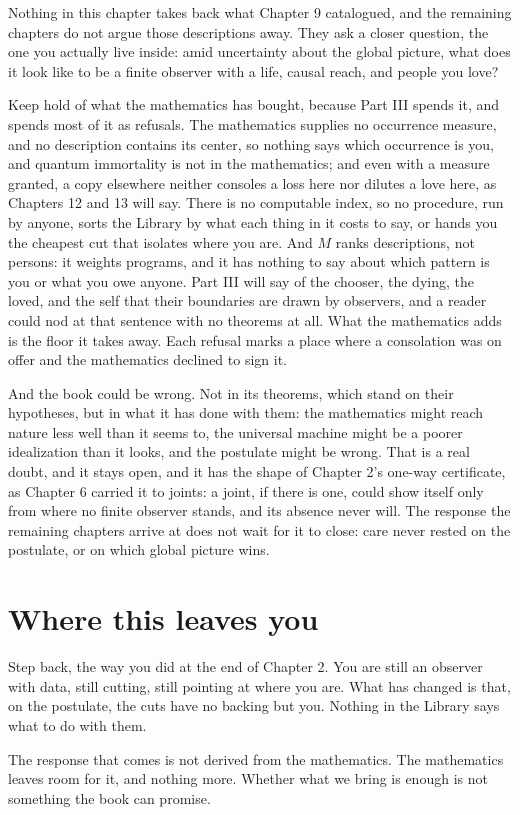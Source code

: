 Nothing in this chapter takes back what Chapter 9 catalogued, and the remaining chapters do not argue those descriptions away. They ask a closer question, the one you actually live inside: amid uncertainty about the global picture, what does it look like to be a finite observer with a life, causal reach, and people you love?

Keep hold of what the mathematics has bought, because Part III spends it, and spends most of it as refusals. The mathematics supplies no occurrence measure, and no description contains its center, so nothing says which occurrence is you, and quantum immortality is not in the mathematics; and even with a measure granted, a copy elsewhere neither consoles a loss here nor dilutes a love here, as Chapters 12 and 13 will say. There is no computable index, so no procedure, run by anyone, sorts the Library by what each thing in it costs to say, or hands you the cheapest cut that isolates where you are. And $M$ ranks descriptions, not persons: it weights programs, and it has nothing to say about which pattern is you or what you owe anyone. Part III will say of the chooser, the dying, the loved, and the self that their boundaries are drawn by observers, and a reader could nod at that sentence with no theorems at all. What the mathematics adds is the floor it takes away. Each refusal marks a place where a consolation was on offer and the mathematics declined to sign it.

And the book could be wrong. Not in its theorems, which stand on their hypotheses, but in what it has done with them: the mathematics might reach nature less well than it seems to, the universal machine might be a poorer idealization than it looks, and the postulate might be wrong. That is a real doubt, and it stays open, and it has the shape of Chapter 2's one-way certificate, as Chapter 6 carried it to joints: a joint, if there is one, could show itself only from where no finite observer stands, and its absence never will. The response the remaining chapters arrive at does not wait for it to close: care never rested on the postulate, or on which global picture wins.

\section*{Where this leaves you}

Step back, the way you did at the end of Chapter 2. You are still an observer with data, still cutting, still pointing at where you are. What has changed is that, on the postulate, the cuts have no backing but you. Nothing in the Library says what to do with them.

The response that comes is not derived from the mathematics. The mathematics leaves room for it, and nothing more. Whether what we bring is enough is not something the book can promise.
